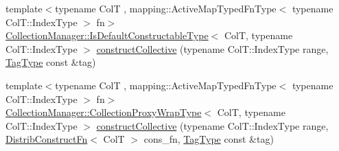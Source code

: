 \begin{DoxyCompactItemize}
{\footnotesize template$<$typename ColT , mapping\+::\+Active\+Map\+Typed\+Fn\+Type$<$ typename Col\+T\+::\+Index\+Type $>$ fn$>$ }\\\hyperlink{structvt_1_1vrt_1_1collection_1_1_collection_manager_af8091fcb8218dad155ea028c9b5d283f}{Collection\+Manager\+::\+Is\+Default\+Constructable\+Type}$<$ ColT, typename Col\+T\+::\+Index\+Type $>$ \hyperlink{structvt_1_1vrt_1_1collection_1_1_collection_manager_a5d1abd77ffc06ec34afa96d317f98a73}{construct\+Collective} (typename Col\+T\+::\+Index\+Type range, \hyperlink{namespacevt_a84ab281dae04a52a4b243d6bf62d0e52}{Tag\+Type} const \&tag)
\item 
{\footnotesize template$<$typename ColT , mapping\+::\+Active\+Map\+Typed\+Fn\+Type$<$ typename Col\+T\+::\+Index\+Type $>$ fn$>$ }\\\hyperlink{structvt_1_1vrt_1_1collection_1_1_collection_manager_a56458ed7f9bb22b631b9b3a745f42f94}{Collection\+Manager\+::\+Collection\+Proxy\+Wrap\+Type}$<$ ColT, typename Col\+T\+::\+Index\+Type $>$ \hyperlink{structvt_1_1vrt_1_1collection_1_1_collection_manager_a9b376e8e7145bf3d0f6b268d7974f783}{construct\+Collective} (typename Col\+T\+::\+Index\+Type range, \hyperlink{structvt_1_1vrt_1_1collection_1_1_collection_manager_a7503830bc133013d542856fa39834dcc}{Distrib\+Construct\+Fn}$<$ ColT $>$ cons\+\_\+fn, \hyperlink{namespacevt_a84ab281dae04a52a4b243d6bf62d0e52}{Tag\+Type} const \&tag)
\end{DoxyCompactItemize}
